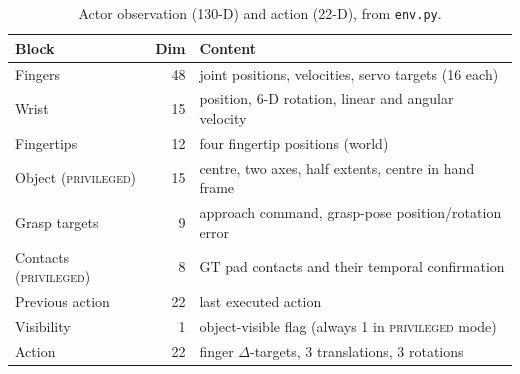 \documentclass[conference,10pt]{IEEEtran}
\newcommand{\priv}{\textsc{privileged}}
\begin{document}
\begin{table}[t]
\caption{Actor observation (130-D) and action (22-D), from \texttt{env.py}.}
\label{tab:obs}
\centering\footnotesize
\setlength{\tabcolsep}{3pt}
\begin{tabular}{@{}lr>{\raggedright\arraybackslash}p{}@{}}
\toprule
Block & Dim & Content \\
\midrule
Fingers & 48 & joint positions, velocities, servo targets (16 each)\\
Wrist & 15 & position, 6-D rotation, linear and angular velocity\\
Fingertips & 12 & four fingertip positions (world)\\
Object (\priv) & 15 & centre, two axes, half extents, centre in hand frame\\
Grasp targets & 9 & approach command, grasp-pose position/rotation error\\
Contacts (\priv) & 8 & GT pad contacts and their temporal confirmation\\
Previous action & 22 & last executed action\\
Visibility & 1 & object-visible flag (always 1 in \priv{} mode)\\
\midrule
Action & 22 & 16 finger $\Delta$-targets, 3 translations, 3 rotations\\
\bottomrule
\end{tabular}
\end{table}
\end{document}
